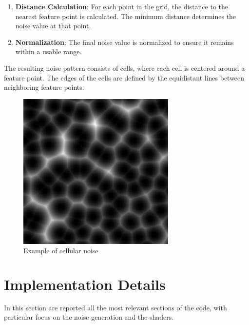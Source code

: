 \documentclass[12pt]{article}
\begin{document}
\begin{itemize}
\begin{enumerate}
        \item \textbf{Distance Calculation}:
        \newline
        For each point in the grid, the distance to the nearest feature point is calculated. The minimum distance determines the noise value at that point.   

        \item \textbf{Normalization}:
        \newline
        The final noise value is normalized to ensure it remains within a usable range.
    \end{enumerate}
    
    The resulting noise pattern consists of cells, where each cell is centered around a feature point. The edges of the cells are defined by the equidistant lines between neighboring feature points.

    \begin{figure}[H]
        \centering
        \includegraphics[width=0.7\textwidth]{Images/cellular.png}
        \caption{Example of cellular noise}
    \end{figure} 
    
\end{itemize}

\newpage

\section{Implementation Details}
\label{sec:implementation}
In this section are reported all the most relevant sections of the code, with particular focus on the noise generation and the shaders.
\newline
\end{document}
